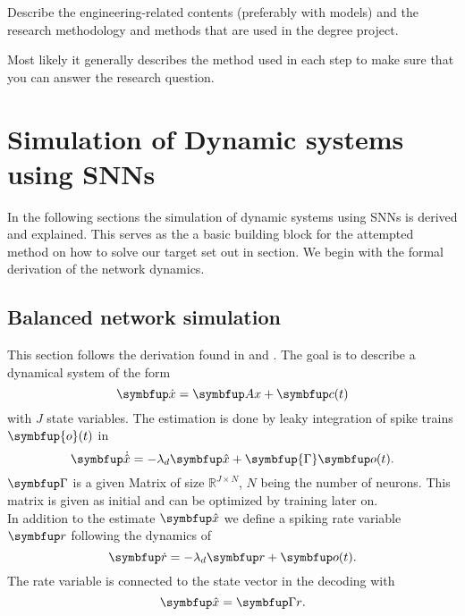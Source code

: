 Describe the engineering-related contents (preferably with models) and the research methodology and methods that are used in the degree project.

Most likely it generally describes the method used in each step to make sure that you can answer the research question.


\section{Simulation of Dynamic systems using \acp{SNN}}\label{sec:simulation}
In the following sections the simulation of dynamic systems using \acp{SNN} is derived and explained. This serves as the a basic building block for the attempted method on how to solve our target set out in section. We begin with the formal derivation of the network dynamics.
\subsection{Balanced network simulation}\label{ssec:balanced_network_sim}

This section follows the derivation found in \cite{boerlin_predictive_2013} and \cite{huang_dynamics_2019}.
The goal is to describe a dynamical system of the form
\begin{equation}\label{eq:x}
\bmu{\dot{x}} = \bmu{Ax} + \bmu{c}(t)
\end{equation}
with $J$ state variables.
The estimation is done by leaky integration of spike trains $\symbfup{o}(t)$ in
\begin{equation}\label{eq:x_hat}
\bmu{\dot{\hat{x}}} = -\lambda_d \bmu{\hat{x}} + \symbfup{\Gamma} \bmu{o}(t).
\end{equation}
$\bmu{\Gamma}$ is a given Matrix of size $\mathbb{R}^{J\times N}$, $N$ being the number of neurons. This matrix is given as initial and can be optimized by training later on\cite{brendel_learning_2020}.\\
In addition to the estimate $\bmu{\hat{x}}$ we define a spiking rate variable $\bmu{r}$ following the dynamics of
\begin{equation}\label{eq:rate}
\bmu{\dot{r}} = -\lambda_d\bmu{r} + \bmu{o}(t).
\end{equation}
The rate variable is connected to the state vector in the decoding with
\begin{equation}\label{eq:decoding}
	\bmu{\hat{x}} = \bmu{\Gamma r}.
\end{equation}

